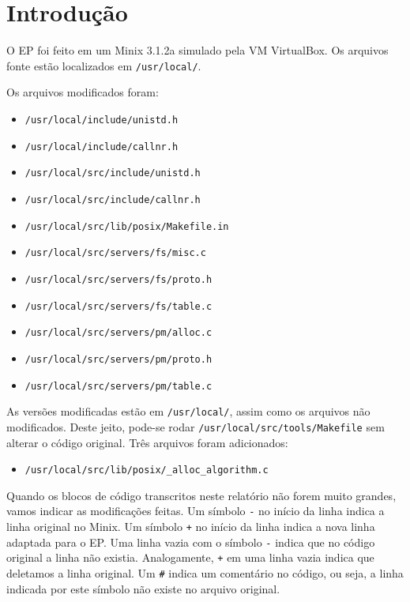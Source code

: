 \documentclass{amsart}
\title[]{\rule{10.5cm}{0.8pt}\\Exercício-Programa 2:\\
Escalonamento de Processos
\\\vspace{2mm}\footnotesize
  Sistemas Operacionais --- MAC0422\\\rule{10cm}{0.8pt}}
\author[]{Renato Lui Geh\\NUSP\@: 8536030\\
          Guilherme Freire\\NUSP\@: 7557373}
\theoremstyle{plain}
\newcommand{\code}[1]{\lstinline[mathescape=true]{#1}}
\begin{document}
\date{\today}
\maketitle

\section{Introdução}

O EP foi feito em um Minix 3.1.2a simulado pela VM VirtualBox. Os arquivos fonte estão localizados
em \code{/usr/local/}.

Os arquivos modificados foram:

\begin{itemize}
  \item \code{/usr/local/include/unistd.h}
  \item \code{/usr/local/include/callnr.h}
  \item \code{/usr/local/src/include/unistd.h}
  \item \code{/usr/local/src/include/callnr.h}
  \item \code{/usr/local/src/lib/posix/Makefile.in}
  \item \code{/usr/local/src/servers/fs/misc.c}
  \item \code{/usr/local/src/servers/fs/proto.h}
  \item \code{/usr/local/src/servers/fs/table.c}
  \item \code{/usr/local/src/servers/pm/alloc.c}
  \item \code{/usr/local/src/servers/pm/proto.h}
  \item \code{/usr/local/src/servers/pm/table.c}
\end{itemize}

As versões modificadas estão em \code{/usr/local/}, assim como os arquivos não modificados. Deste
jeito, pode-se rodar \code{/usr/local/src/tools/Makefile} sem alterar o código original. Três
arquivos foram adicionados:

\begin{itemize}
  \item \code{/usr/local/src/lib/posix/_alloc_algorithm.c}
\end{itemize}

Quando os blocos de código transcritos neste relatório não forem muito grandes, vamos indicar as
modificações feitas. Um símbolo \code{-} no início da linha indica a linha original no Minix. Um
símbolo \code{+} no início da linha indica a nova linha adaptada para o EP\@. Uma linha vazia com o
símbolo \code{-} indica que no código original a linha não existia. Analogamente, \code{+} em uma
linha vazia indica que deletamos a linha original. Um \code{#} indica um comentário no código, ou
seja, a linha indicada por este símbolo não existe no arquivo original.
\end{document}

